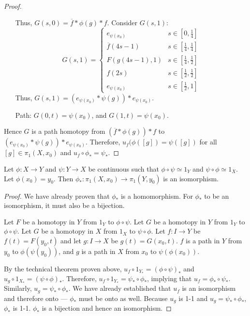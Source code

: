 \begin{proof}
\begin{itemize}
\[\]
Thus, $G(s,0)=\overline{f}*\phi(g)*f$. Consider $G(s,1)$:
\[
G(s,1)=
\begin{cases}
e_{\psi(x_0)} &s\in\left[0,\frac{1}{4}\right]\\
\overline{f}(4s-1) &s\in\left[\frac{1}{4},\frac{1}{4}\right]\\
F(g(4s-1),1) &s\in\left[\frac{1}{4},\frac{1}{2}\right]\\
f(2s) &s\in\left[\frac{1}{2},\frac{1}{2}\right]\\
e_{\psi(x_0)} &s\in\left[\frac{1}{2},1\right]
\end{cases}
\]
Thus, $G(s,1) = \left( e_{\psi(x_0)}*\psi(g)\right)*e_{\psi(x_0)}$.
\item[Path:] $G(0,t)=\psi(x_0)$, and $G(1,t)=\psi(x_0)$.
\end{itemize}

Hence $G$ is a path homotopy from $\left(\overline{f}*\phi(g)\right)*f$ to $\left( e_{\psi(x_0)}*\psi(g)\right)*e_{\psi(x_0)}$. Therefore, $u_f(\phi([g])=\psi([g])$ for all $[g]\in\pi_1(X,x_0)$ and $u_f\circ\phi_*=\psi_*$.
\end{proof}

\begin{corollary}
Let $\phi:X\rightarrow Y$ and $\psi:Y\rightarrow X$ be continuous such that $\phi\circ\psi \simeq 1_Y$ and $\psi\circ\phi \simeq 1_X$. Let $\phi(x_0)=y_0$. Then $\phi_*:\pi_1(X,x_0)\rightarrow \pi_1(Y,y_0)$ is an isomorphism.
\end{corollary}
\begin{proof}
We have already proven that $\phi_*$ is a homomorphism. For $\phi_*$ to be an isomorphism, it must also be a bijection.

Let $F$ be a homotopy in $Y$ from $1_Y$ to $\phi\circ\psi$. Let $G$ be a homotopy in $Y$ from $1_Y$ to $\phi\circ\psi$. Let $G$ be a homotopy in $X$ from $1_X$ to $\psi\circ\phi$. Let $f:I\rightarrow Y$ be $f(t)=F(y_0,t)$ and let $g:I\rightarrow X$ be $g(t)=G(x_0,t)$. $f$ is a path in $Y$ from $y_0$ to $\phi(\psi(y_0))$, and $g$ is a path in $X$ from $x_0$ to $\psi(\phi(x_0))$.

By the technical theorem proven above, $u_f\circ 1_{Y_*}=(\phi\circ\psi)_*$ and $u_g\circ1_{X_*}=(\psi\circ\phi)_*$. Therefore, $u_f\circ1_{Y_*} = \psi_*\circ \phi_*$, implying that $u_f =\phi_*\circ\psi_*$. Similarly, $u_g = \psi_*\circ\phi_*$. We have already established that $u_f$ is an isomorphism and therefore onto --- $\phi_*$ must be onto as well. Because $u_g$ is 1-1 and $u_g=\psi_*\circ\phi_*$,  $\phi_*$ is 1-1. $\phi_*$ is a bijection and hence an isomorphism.
\end{proof}



